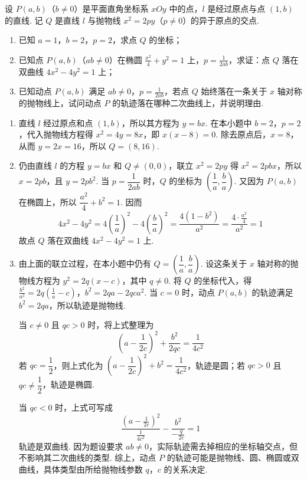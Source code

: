 \begin{problem}
设 \(P(a, b)\)（\(b \neq 0\)）是平面直角坐标系 \(xOy\) 中的点，\(l\) 是经过原点与点 \((1, b)\) 的直线. 记 \(Q\) 是直线 \(l\) 与抛物线 \(x^2 = 2py\)（\(p \neq 0\)）的异于原点的交点. 
\begin{enumerate}
    \item 已知 \(a = 1\)，\(b = 2\)，\(p = 2\)，求点 \(Q\) 的坐标；
    \item 已知点 \(P(a, b)\)（\(ab \neq 0\)）在椭圆 \(\frac{x^2}{4} + y^2 = 1\) 上，\(p = \frac{1}{2ab}\)，求证：点 \(Q\) 落在双曲线 \(4x^2 - 4y^2 = 1\) 上；
\item 已知动点 \(P(a, b)\) 满足 \(ab \neq 0\)，\(p = \frac{1}{2ab}\)，若点 \(Q\) 始终落在一条关于 \(x\) 轴对称的抛物线上，试问动点 \(P\) 的轨迹落在哪种二次曲线上，并说明理由.
\end{enumerate}
\end{problem}

\begin{solution}
\begin{enumerate}
\item 直线 \(l\) 经过原点和点 \((1,b)\)，所以其方程为 \(y=bx\). 在本小题中 \(b=2\)，\(p=2\)，代入抛物线方程得 \(x^{2}=4y=8x\)，即 \(x(x-8)=0\). 除去原点后，\(x=8\)，从而 \(y=2x=16\)，所以 \(Q=(8,16)\).
\item 仍由直线 \(l\) 的方程 \(y=bx\) 和 \(Q\ne(0,0)\)，联立 \(x^{2}=2py\) 得 \(x^{2}=2pbx\)，所以 \(x=2pb\)，且 \(y=2pb^{2}\). 当 \(p=\dfrac{1}{2ab}\) 时，\(Q\) 的坐标为 \(\left(\dfrac{1}{a},\dfrac{b}{a}\right)\). 又因为 \(P(a,b)\) 在椭圆上，所以 \(\dfrac{a^{2}}{4}+b^{2}=1\). 因而
\[
4x^{2}-4y^{2}=4\left(\frac{1}{a}\right)^{2}-4\left(\frac{b}{a}\right)^{2}=\frac{4\left(1-b^{2}\right)}{a^{2}}=\frac{4\cdot \frac{a^{2}}{4}}{a^{2}}=1
\]
故点 \(Q\) 落在双曲线 \(4x^{2}-4y^{2}=1\) 上.
\item 由上面的联立过程，在本小题中仍有 \(Q=\left(\dfrac{1}{a},\dfrac{b}{a}\right)\). 设这条关于 \(x\) 轴对称的抛物线方程为 \(y^{2}=2q(x-c)\)，其中 \(q\ne0\). 将 \(Q\) 的坐标代入，得
\(\frac{b^{2}}{a^{2}}=2q\left(\frac{1}{a}-c\right)\)，\(b^{2}=2qa-2qca^{2}\).
当 \(c=0\) 时，动点 \(P(a,b)\) 的轨迹满足 \(b^{2}=2qa\)，所以轨迹是抛物线.

当 \(c\ne0\) 且 \(qc>0\) 时，将上式整理为
\[
\left(a-\frac{1}{2c}\right)^{2}+\frac{b^{2}}{2qc}=\frac{1}{4c^{2}}
\]
若 \(qc=\dfrac{1}{2}\)，则上式化为 \(\left(a-\dfrac{1}{2c}\right)^{2}+b^{2}=\dfrac{1}{4c^{2}}\)，轨迹是圆；若 \(qc>0\) 且 \(qc\ne\dfrac{1}{2}\)，轨迹是椭圆.

当 \(qc<0\) 时，上式可写成
\[
\frac{\left(a-\frac{1}{2c}\right)^{2}}{\frac{1}{4c^{2}}}-\frac{b^{2}}{-\frac{q}{2c}}=1
\]
轨迹是双曲线. 因为题设要求 \(ab\ne0\)，实际轨迹需去掉相应的坐标轴交点，但不影响其二次曲线的类型. 综上，动点 \(P\) 的轨迹可能是抛物线、圆、椭圆或双曲线，具体类型由所给抛物线参数 \(q\)，\(c\) 的关系决定.
\end{enumerate}
\end{solution}

